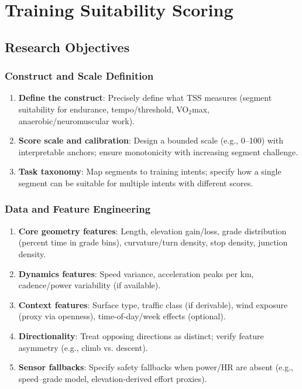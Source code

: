 \documentclass[11pt,twoside]{report}
\begin{document}
\section{Training Suitability Scoring}

\subsection{Research Objectives}
\subsubsection{Construct and Scale Definition}
\begin{enumerate}
	\item \textbf{Define the construct}: Precisely define what TSS measures (segment suitability for endurance, tempo/threshold, VO$_2$max, anaerobic/neuromuscular work).
	\item \textbf{Score scale and calibration}: Design a bounded scale (e.g., 0--100) with interpretable anchors; ensure monotonicity with increasing segment challenge.
	\item \textbf{Task taxonomy}: Map segments to training intents; specify how a single segment can be suitable for multiple intents with different scores.
\end{enumerate}

\subsubsection{Data and Feature Engineering}
\begin{enumerate}
	\item \textbf{Core geometry features}: Length, elevation gain/loss, grade distribution (percent time in grade bins), curvature/turn density, stop density, junction density.
	\item \textbf{Dynamics features}: Speed variance, acceleration peaks per km, cadence/power variability (if available).
	\item \textbf{Context features}: Surface type, traffic class (if derivable), wind exposure (proxy via openness), time-of-day/week effects (optional).
	\item \textbf{Directionality}: Treat opposing directions as distinct; verify feature asymmetry (e.g., climb vs. descent).
	\item \textbf{Sensor fallbacks}: Specify safety fallbacks when power/HR are absent (e.g., speed–grade model, elevation-derived effort proxies).
\end{enumerate}
\end{document}
